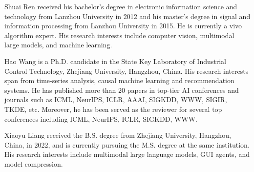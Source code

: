 \vspace{-3em}

\begin{IEEEbiography}{Shuai Ren}
received his bachelor's degree in electronic information science and technology from Lanzhou University in 2012 and his master's degree in signal and information processing from Lanzhou University in 2015. He is currently a vivo algorithm expert. His research interests include computer vision, multimodal large models, and machine learning.
\end{IEEEbiography}

\vspace{-3em}

\begin{IEEEbiography}{Hao Wang}
is a Ph.D. candidate in the State Key Laboratory of Industrial Control Technology, Zhejiang University, Hangzhou, China. 
His research interests span from time-series analysis, causal machine learning and recommendation systems.
He has published more than 20 papers in top-tier AI conferences and journals such as ICML, NeurIPS, ICLR, AAAI, SIGKDD, WWW, SIGIR, TKDE, etc.
Moreover, he has been served as the reviewer for several top conferences including ICML, NeurIPS, ICLR, SIGKDD, WWW.
\end{IEEEbiography}

\vspace{-3em}

\begin{IEEEbiography}{Xiaoyu Liang}
received the B.S. degree from Zhejiang University, Hangzhou, China, in 2022, and is currently pursuing the M.S. degree at the same institution. His research interests include multimodal large language models, GUI agents, and model compression.
\end{IEEEbiography}

